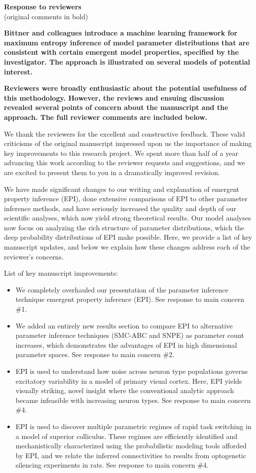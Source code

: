 \documentclass[11pt,a4paper]{article}
\begin{document}
 

{\Large \textbf{Response to reviewers}} \\
(original comments in bold)

\textbf{Bittner and colleagues introduce a machine learning framework for maximum entropy inference of model parameter distributions that are consistent with certain emergent model properties, specified by the investigator. The approach is illustrated on several models of potential interest.} 

\textbf{Reviewers were broadly enthusiastic about the potential usefulness of this methodology. However, the reviews and ensuing discussion revealed several points of concern about the manuscript and the approach. The full reviewer comments are included below.} 

We thank the reviewers for the excellent and constructive feedback.  These valid criticisms of the original manuscript impressed upon us the importance of making key improvements to this research project.  We spent more than half of a year advancing this work according to the reviewer requests and suggestions, and we are excited to present them to you in a dramatically improved revision.

We have made significant changes to our writing and explanation of emergent property inference (EPI), done extensive comparisons of EPI to other parameter inference methods, and have seriously increased the quality and depth of our scientific analyses, which now yield strong theoretical results.  Our model analyses now focus on analyzing the rich structure of parameter distributions, which the deep probability distributions of EPI make possible.  Here, we provide a list of key manuscript updates, and below we explain how these changes address each of the reviewer’s concerns.

List of key manuscript improvements:
\begin{itemize}
\item We completely overhauled our presentation of the parameter inference technique emergent property inference (EPI). See response to main concern \#1.
\item We added an entirely new results section to compare EPI to alternative parameter inference techniques (SMC-ABC and SNPE) as parameter count increases, which demonstrates the advantages of EPI in high dimensional parameter spaces. See response to main concern \#2.
\item EPI is used to understand how noise across neuron type populations governs excitatory variability in a model of primary visual cortex.  
Here, EPI yields visually striking, novel insight where the conventional analytic approach became infeasible with increasing neuron types.  See response to main concern \#4.
\item EPI is used to discover multiple parametric regimes of rapid task switching in a model of superior colliculus.  
These regimes are efficiently identified and mechanistically characterized using the probabilistic modeling tools afforded by EPI, and we relate the inferred connectivities to results from optogenetic silencing experiments in rats. See response to main concern \#4.
\end{itemize}
\end{document}
